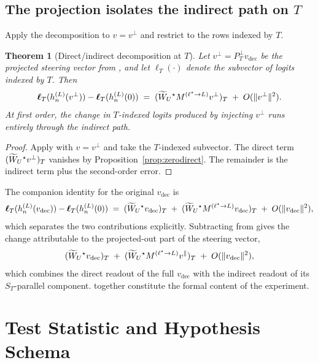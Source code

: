 \documentclass[11pt,letterpaper]{article}
\theoremstyle{plain}
\newtheorem{theorem}{Theorem}[section]
\theoremstyle{definition}
\newcommand{\1}{\mathbf{1}}
\newcommand{\WUt}{\widetilde{W}_{U}\mathchoice{}{}{}{}}
\newcommand{\vdec}{v_{\text{dec}}}
\newcommand{\vperp}{v^{\perp}}
\newcommand{\vpar}{v^{\parallel}}
\newcommand{\PTperp}{P_{T}^{\perp}}
\newcommand{\hres}{h}
\begin{document}
\subsection{The projection isolates the indirect path on $T$}

Apply the decomposition to $v = \vperp$ and restrict to the rows indexed by $T$.

\begin{theorem}[Direct/indirect decomposition at $T$]\label{thm:decomp}
Let $\vperp = \PTperp \vdec$ be the projected steering vector from , and let $\bm{\ell}_T(\cdot)$ denote the subvector of logits indexed by $T$. Then
\begin{equation}
\bm{\ell}_T(\hres^{(L)}_n(\vperp)) - \bm{\ell}_T(\hres^{(L)}_n(0)) \;=\; (\WUt^\star M^{(\ell^\star \to L)} \vperp)_T \;+\; O(\|\vperp\|^2).
\label{eq:thm}
\end{equation}
At first order, the change in $T$-indexed logits produced by injecting $\vperp$ runs entirely through the indirect path.
\end{theorem}

\begin{proof}
Apply  with $v = \vperp$ and take the $T$-indexed subvector. The direct term $(\WUt^\star \vperp)_T$ vanishes by Proposition~\ref{prop:zerodirect}. The remainder is the indirect term plus the second-order error.
\end{proof}

The companion identity for the original $\vdec$ is
\begin{equation}
\bm{\ell}_T(\hres^{(L)}_n(\vdec)) - \bm{\ell}_T(\hres^{(L)}_n(0)) \;=\; (\WUt^\star \vdec)_T \;+\; (\WUt^\star M^{(\ell^\star \to L)} \vdec)_T \;+\; O(\|\vdec\|^2),
\label{eq:fulldecomp}
\end{equation}
which separates the two contributions explicitly. Subtracting  from  gives the change attributable to the projected-out part of the steering vector,
\begin{equation}
(\WUt^\star \vdec)_T \;+\; (\WUt^\star M^{(\ell^\star \to L)} \vpar)_T \;+\; O(\|\vdec\|^2),
\label{eq:residualcontribution}
\end{equation}
which combines the direct readout of the full $\vdec$ with the indirect readout of its $S_T$-parallel component.  together constitute the formal content of the experiment.

\section{Test Statistic and Hypothesis Schema}\label{sec:statistic}
\end{document}
